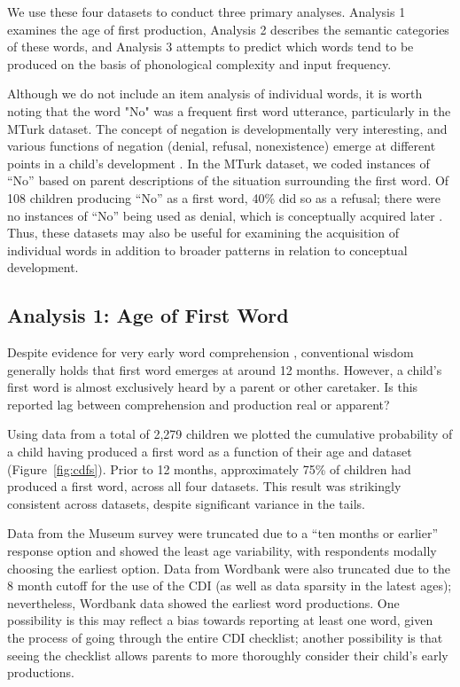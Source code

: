 \documentclass[10pt,letterpaper]{article}
\begin{document}
We use these four datasets to conduct three primary analyses. Analysis 1 examines the age of first production, Analysis 2 describes the semantic categories of these words, and Analysis 3 attempts to predict which words tend to be produced on the basis of phonological complexity and input frequency.

Although we do not include an item analysis of individual words, it is worth noting that the word "No" was a frequent first word utterance, particularly in the MTurk dataset. The concept of negation is developmentally very interesting, and various functions of negation (denial, refusal, nonexistence) emerge at different points in a child's development \cite{pea1982}. In the MTurk dataset, we coded instances of ``No'' based on parent descriptions of the situation surrounding the first word. Of 108 children producing ``No'' as a first word, 40\% did so as a refusal; there were no instances of ``No'' being used as denial, which is conceptually acquired later \cite{pea1982}. Thus, these datasets may also be useful for examining the acquisition of individual words in addition to broader patterns in relation to conceptual development.

\subsection{Analysis 1: Age of First Word} 

Despite evidence for very early word comprehension \cite{tincoff1999,tincoff2012,bergelson2012}, conventional wisdom generally holds that first word emerges at around 12 months. However, a child's first word is almost exclusively heard by a parent or other caretaker. Is this reported lag between comprehension and production real or apparent? 

Using data from a total of 2,279 children we plotted the cumulative probability of a child having produced a first word as a function of their age and dataset (Figure~\ref{fig:cdfs}). Prior to 12 months, approximately 75\% of children had produced a first word, across all four datasets. This result was strikingly consistent across datasets, despite significant variance in the tails. 

Data from the Museum survey were truncated due to a ``ten months or earlier'' response option and showed the least age variability, with respondents modally choosing the earliest option. Data from Wordbank were also truncated due to the 8 month cutoff for the use of the CDI (as well as data sparsity in the latest ages); nevertheless, Wordbank data showed the earliest word productions. One possibility is this may reflect a bias towards reporting at least one word, given the process of going through the entire CDI checklist; another possibility is that seeing the checklist allows parents to more thoroughly consider their child's early productions. 
\end{document}
